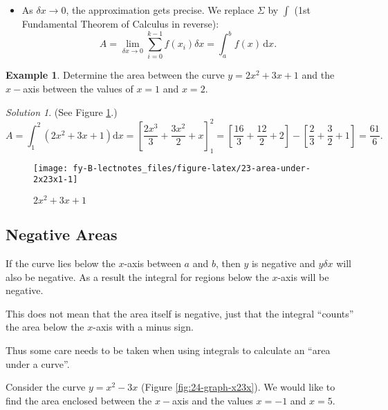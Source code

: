 \documentclass[
  11pt,
  oneside]{book}
\providecommand{\tightlist}{%
  \setlength{\itemsep}{0pt}\setlength{\parskip}{0pt}}
\newcommand{\slide}{}
\theoremstyle{definition}
\theoremstyle{definition}
\newtheorem{example}{Example}[chapter]
\theoremstyle{definition}
\theoremstyle{definition}
\theoremstyle{remark}
\newtheorem*{solution}{Solution}
\begin{document}
\begin{itemize}
\tightlist
\item
  As \(\delta x \to 0\), the approximation gets precise. We replace \(\Sigma\) by \(\int\)
  (1st Fundamental Theorem of Calculus in reverse):
  \[
  A =\lim\limits_{\delta x\to 0}\sum_{i=0}^{k-1}f(x_i) \delta x = \int_a^b f(x)\,\mathrm{d}x.
  \]
  \slide
\end{itemize}

\begin{example}
Determine the area between the curve \(y=2x^2+3x+1\) and the \(x-\)axis between the values of \(x=1\) and \(x=2\).
\end{example}

\begin{solution}
\leavevmode

(See Figure \ref{fig:23-area-under-2x23x1}.)
\[
A=\int_1^2(2x^2+3x+1)\mathrm{d}x = \left[\frac{2x^3}{3}+\frac{3x^2}{2}+x\right]_1^2 = \left[\frac{16}{3}+\frac{12}{2}+2\right]-\left[\frac{2}{3}+\frac 32 + 1\right] = \frac{61}{6}.
\]

\begin{figure}

{\centering \texttt{[image: fy-B-lectnotes\_files/figure-latex/23-area-under-2x23x1-1]} 

}

\caption{$2x^2+3x+1$}\label{fig:23-area-under-2x23x1}
\end{figure}

\end{solution}

\slide

\subsection{Negative Areas}\label{negative-areas}

If the curve lies below the \(x\)-axis between \(a\) and \(b\), then \(y\) is negative and \(y\delta x\) will also be negative. As a result the integral for regions below the \(x\)-axis will be negative.

This does not mean that the area itself is negative, just that the integral ``counts'' the area below the \(x\)-axis with a minus sign.

Thus some care needs to be taken when using integrals to calculate an ``area under a curve''.

\slide

Consider the curve \(y = x^2 - 3x\) (Figure \ref{fig:24-graph-x23x}). We would like to find the area enclosed between the \(x-\)axis and the values \(x = -1\) and \(x = 5\).
\end{document}
